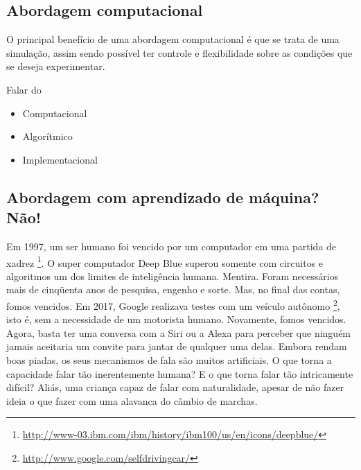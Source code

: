 
\subsection{Abordagem computacional}

O principal benefício de uma abordagem computacional é que se trata de uma simulação, assim sendo possível ter controle e flexibilidade sobre as condições que se deseja experimentar. 


Falar do \citep{marr1982vision}

\begin{itemize}
\item Computacional
\item Algorítmico
\item Implementacional
\end{itemize}



\subsection{Abordagem com aprendizado de máquina? Não!}

Em 1997, um ser humano foi vencido por um computador em uma partida de xadrez \footnote{\url{http://www-03.ibm.com/ibm/history/ibm100/us/en/icons/deepblue/}}. O super computador Deep Blue superou somente com circuitos e algoritmos um dos limites de inteligência humana. Mentira. Foram necessários mais de cinqüenta anos de pesquisa, engenho e sorte. Mas, no final das contas, fomos vencidos. Em 2017, Google realizava testes com um veículo autônomo \footnote{\url{http://www.google.com/selfdrivingcar/}}, isto é, sem a necessidade de um motorista humano. Novamente, fomos vencidos.\\

Agora, basta ter uma conversa com a Siri ou a Alexa para perceber que ninguém jamais aceitaria um convite para jantar de qualquer uma delas. Embora rendam boas piadas, os seus mecanismos de fala são muitos artificiais. O que torna a capacidade falar tão inerentemente humana? E o que torna falar tão intricamente difícil? Aliás, uma criança capaz de falar com naturalidade, apesar de não fazer ideia o que fazer com uma alavanca do câmbio de marchas.



